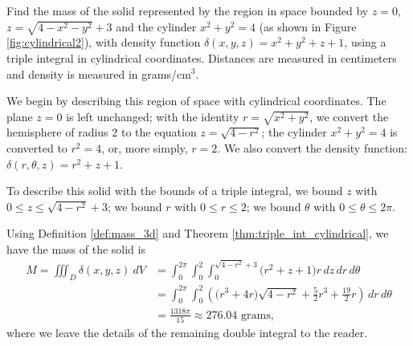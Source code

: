 
{Find the mass of the solid represented by the region in space bounded by $z=0$, $z=\sqrt{4-x^2-y^2}+3$ and the cylinder $x^2+y^2=4$ (as shown in Figure \ref{fig:cylindrical2}), with density function $\delta(x,y,z) = x^2+y^2+z+1$, using a triple integral in cylindrical coordinates. Distances are measured in centimeters and density is measured in grams/cm$^3$.
}
{We begin by describing this region of space with cylindrical coordinates. The plane $z=0$ is left unchanged; with the identity $r=\sqrt{x^2+y^2}$, we convert the hemisphere of radius 2 to the equation $z=\sqrt{4-r^2}$; the cylinder $x^2+y^2=4$ is converted to $r^2=4$, or, more simply, $r=2$.  We also convert the density function: $\delta(r,\theta,z) = r^2+z+1$. 

To describe this solid with the bounds of a triple integral, we bound $z$ with $0\leq z\leq \sqrt{4-r^2}+3$; we bound $r$ with $0 \leq r \leq 2$; we bound $\theta$ with $0 \leq \theta \leq 2\pi$.

Using Definition \ref{def:mass_3d} and Theorem \ref{thm:triple_int_cylindrical}, we have the mass of the solid is
\begin{align*}
M=\iiint_D\delta(x,y,z)\ dV &= \int_0^{2\pi}\int_0^2\int_0^{\sqrt{4-r^2}+3}\big(r^2+z+1\big)r\,dz\,dr\,d\theta \\
&= \int_0^{2\pi}\int_0^2\left(\big(r^3+4r\big)\sqrt{4-r^2}+\frac52r^3+\frac{19}2r\right)\,dr\,d\theta \\
&= \frac{1318\pi}{15} \approx 276.04\text{ grams},
\end{align*}
where we leave the details of the remaining double integral to the reader.
}\\

